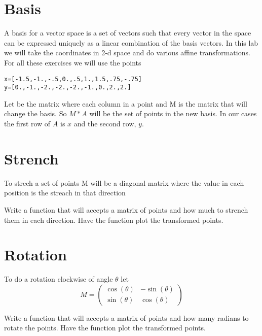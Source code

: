 \label{lab:ChangeBasis}


\section*{Basis}

A basis for a vector space is a set of vectors such that every vector in the space can be expressed uniquely as a linear combination of the basis vectors. In this lab we will take the coordinates in 2-d space and do various affine transformations. For all these exercises we will use the points
\begin{lstlisting}
x=[-1.5,-1.,-.5,0.,.5,1.,1.5,.75,-.75]
y=[0.,-1.,-2.,-2.,-2.,-1.,0.,2.,2.]
\end{lstlisting}
Let be the matrix where each column in a point and M is the matrix that will change the basis. So $M*A$ will be the set of points in the new basis. In our cases the first row of $A$ is $x$ and the second row, $y$. 

\section*{Strench}
To strech a set of points M will be a diagonal matrix where the value in each position is the streach in that direction

\begin{problem}
Write a function that will accepts a matrix of points and how much to strench them in each direction. Have the function plot the transformed points.
\end{problem}

\section*{Rotation}
To do a rotation clockwise of angle $\theta$ let
\[
M = \begin{pmatrix}
\cos(\theta) & -\sin(\theta) \\
\sin(\theta) & \cos(\theta) 
\end{pmatrix}
\]


\begin{problem}
Write a function that will accepts a matrix of points and how many radians to rotate the points. Have the function plot the transformed points.
\end{problem}

